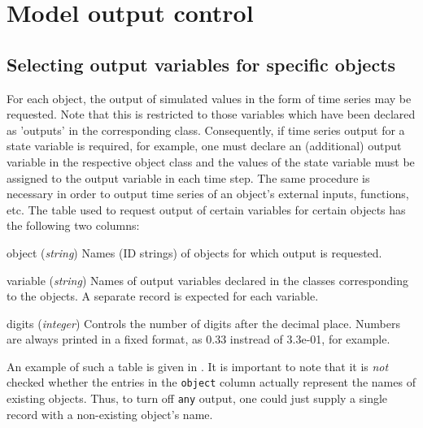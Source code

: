 
\FloatBarrier

\section{Model output control} 

\subsection{Selecting output variables for specific objects} \label{sec:input-outputSelected} 

For each object, the output of simulated values in the form of time series may be requested. Note that this is restricted to those variables which have been declared as 'outputs' in the corresponding class. Consequently, if time series output for a state variable is required, for example, one must declare an (additional) output variable in the respective object class and the values of the state variable must be assigned to the output variable in each time step. The same procedure is necessary in order to output time series of an object's external inputs, functions, etc. The table used to request output of certain variables for certain objects has the following two columns:

\begin{columndef}
  \item [object] (\textit{string}) Names (ID strings) of objects for which output is requested.
  \item [variable] (\textit{string}) Names of output variables declared in the classes corresponding to the objects. A separate record is expected for each variable.
  \item [digits] (\textit{integer}) Controls the number of digits after the decimal place. Numbers are always printed in a fixed format, \ie{} as 0.33 instread of 3.3e-01, for example.
\end{columndef}

An example of such a table is given in . It is important to note that it is \emph{not} checked whether the entries in the \verb!object! column actually represent the names of existing objects. Thus, to turn off \verb!any! output, one could just supply a single record with a non-existing object's name.

